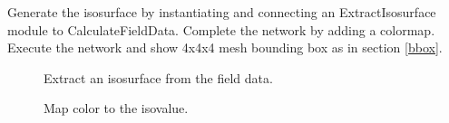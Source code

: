 \documentclass[fleqn,11pt,openany]{book}
\begin{document}
Generate the isosurface by instantiating and connecting an ExtractIsosurface module to CalculateFieldData.
Complete the network by adding a colormap.
Execute the network and show 4x4x4 mesh bounding box as in section \ref{bbox}.

\begin{figure}[H]
\caption{Extract an isosurface from the field data.}
\label{fig:extractisosurf2}
\end{figure}

\begin{figure}[H]
\caption{Map color to the isovalue.}
\label{fig:conncolormap}
\end{figure}
\end{document}

